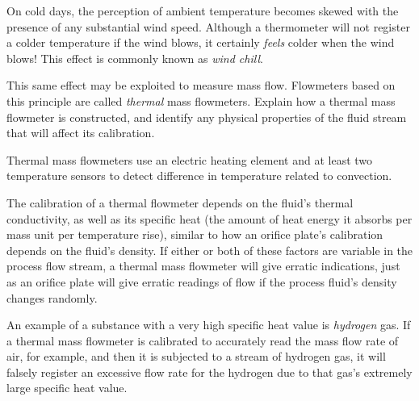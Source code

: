 

On cold days, the perception of ambient temperature becomes skewed with the presence of any substantial wind speed.  Although a thermometer will not register a colder temperature if the wind blows, it certainly {\it feels} colder when the wind blows!  This effect is commonly known as {\it wind chill}.

This same effect may be exploited to measure mass flow.  Flowmeters based on this principle are called {\it thermal} mass flowmeters.  Explain how a thermal mass flowmeter is constructed, and identify any physical properties of the fluid stream that will affect its calibration.







Thermal mass flowmeters use an electric heating element and at least two temperature sensors to detect difference in temperature related to convection.  

The calibration of a thermal flowmeter depends on the fluid's thermal conductivity, as well as its specific heat (the amount of heat energy it absorbs per mass unit per temperature rise), similar to how an orifice plate's calibration depends on the fluid's density.  If either or both of these factors are variable in the process flow stream, a thermal mass flowmeter will give erratic indications, just as an orifice plate will give erratic readings of flow if the process fluid's density changes randomly.

\vskip 10pt

An example of a substance with a very high specific heat value is {\it hydrogen} gas.  If a thermal mass flowmeter is calibrated to accurately read the mass flow rate of air, for example, and then it is subjected to a stream of hydrogen gas, it will falsely register an excessive flow rate for the hydrogen due to that gas's extremely large specific heat value.










